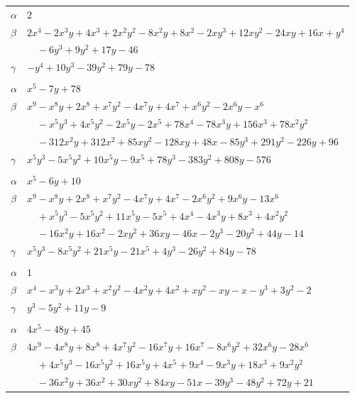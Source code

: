 \documentclass[11pt]{article}
\begin{document}
\begin{longtable}{@{}ll@{}}
$\alpha$ & $2$\\
$\beta$ & $2x^{4}-2x^{3}y+4x^{3}+2x^{2}y^{2}-8x^{2}y+8x^{2}-2xy^{3}+12xy^{2}-24xy+16x+y^{4}$\\
 & $\quad -6y^{3}+9y^{2}+17y-46$\\
$\gamma$ & $-y^{4}+10y^{3}-39y^{2}+79y-78$\\
\addlinespace[3pt]
\multicolumn{2}{@{}l}{$\{i,j\}=\{15,17\}$, $k_{ij}=2^{3}\cdot 3^{2}\cdot 7$}\\
$\alpha$ & $x^{5}-7y+78$\\
$\beta$ & $x^{9}-x^{8}y+2x^{8}+x^{7}y^{2}-4x^{7}y+4x^{7}+x^{6}y^{2}-2x^{6}y-x^{6}$\\
 & $\quad -x^{5}y^{3}+4x^{5}y^{2}-2x^{5}y-2x^{5}+78x^{4}-78x^{3}y+156x^{3}+78x^{2}y^{2}$\\
 & $\quad -312x^{2}y+312x^{2}+85xy^{2}-128xy+48x-85y^{3}+291y^{2}-226y+96$\\
$\gamma$ & $x^{5}y^{3}-5x^{5}y^{2}+10x^{5}y-9x^{5}+78y^{3}-383y^{2}+808y-576$\\
\addlinespace[3pt]
\multicolumn{2}{@{}l}{$\{i,j\}=\{15,18\}$, $k_{ij}=2^{2}\cdot 3$}\\
$\alpha$ & $x^{5}-6y+10$\\
$\beta$ & $x^{9}-x^{8}y+2x^{8}+x^{7}y^{2}-4x^{7}y+4x^{7}-2x^{6}y^{2}+9x^{6}y-13x^{6}$\\
 & $\quad +x^{5}y^{3}-5x^{5}y^{2}+11x^{5}y-5x^{5}+4x^{4}-4x^{3}y+8x^{3}+4x^{2}y^{2}$\\
 & $\quad -16x^{2}y+16x^{2}-2xy^{2}+36xy-46x-2y^{3}-20y^{2}+44y-14$\\
$\gamma$ & $x^{5}y^{3}-8x^{5}y^{2}+21x^{5}y-21x^{5}+4y^{3}-26y^{2}+84y-78$\\
\addlinespace[3pt]
\multicolumn{2}{@{}l}{$\{i,j\}=\{15,23\}$, $k_{ij}=3^{2}$}\\
$\alpha$ & $1$\\
$\beta$ & $x^{4}-x^{3}y+2x^{3}+x^{2}y^{2}-4x^{2}y+4x^{2}+xy^{2}-xy-x-y^{3}+3y^{2}-2$\\
$\gamma$ & $y^{3}-5y^{2}+11y-9$\\
\addlinespace[3pt]
\multicolumn{2}{@{}l}{$\{i,j\}=\{15,26\}$, $k_{ij}=3^{2}\cdot 11$}\\
$\alpha$ & $4x^{5}-48y+45$\\
$\beta$ & $4x^{9}-4x^{8}y+8x^{8}+4x^{7}y^{2}-16x^{7}y+16x^{7}-8x^{6}y^{2}+32x^{6}y-28x^{6}$\\
 & $\quad +4x^{5}y^{3}-16x^{5}y^{2}+16x^{5}y+4x^{5}+9x^{4}-9x^{3}y+18x^{3}+9x^{2}y^{2}$\\
 & $\quad -36x^{2}y+36x^{2}+30xy^{2}+84xy-51x-39y^{3}-48y^{2}+72y+21$\\

\end{longtable}
\end{document}
